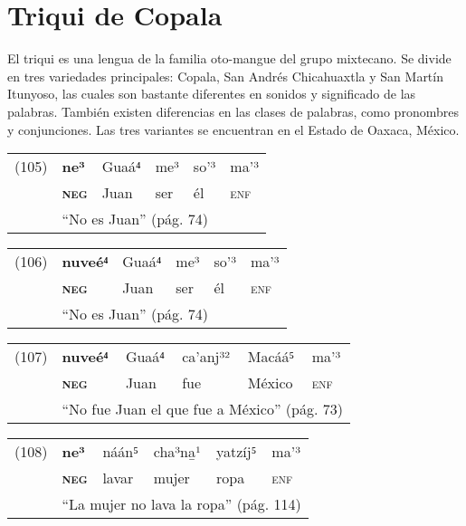 \section*{Triqui de Copala}

\noindent El triqui es una lengua de la familia oto-mangue del grupo mixtecano. Se divide en tres variedades principales: Copala, San Andrés Chicahuaxtla y San Martín Itunyoso, las cuales son bastante diferentes en sonidos y significado de las palabras. También existen diferencias en las clases de palabras, como pronombres y conjunciones. Las tres variantes se encuentran en el Estado de Oaxaca, México. \vspace{0.5cm}

{\setmainfont{Charis SIL} 

\begin{tabular}{llllll}
(105) & \textbf{ne³} & Guaá⁴ & me³ & so'³ & ma'³ \\
& \textsc{\textbf{neg}} & Juan & ser & él & \textsc{enf} \\
& \multicolumn{5}{l}{``No es Juan'' (pág. 74)}
\end{tabular} \vspace{0.3cm}

\begin{tabular}{llllll}
(106) & \textbf{nuveé⁴} & Guaá⁴ & me³ & so'³ & ma'³ \\
& \textsc{\textbf{neg}} & Juan & ser & él & \textsc{enf} \\
& \multicolumn{5}{l}{``No es Juan'' (pág. 74)}
\end{tabular} \vspace{0.3cm}

\begin{tabular}{llllll}
(107) & \textbf{nuveé⁴} & Guaá⁴ & ca'anj³² & Macáá⁵ & ma'³ \\
& \textsc{\textbf{neg}} & Juan & fue & México & \textsc{enf} \\
& \multicolumn{5}{l}{``No fue Juan el que fue a México'' (pág. 73)} 
\end{tabular} \vspace{0.3cm}

\begin{tabular}{llllll}
(108) & \textbf{ne³} & náán⁵ & cha³na̱¹ & yatzíj⁵ & ma'³ \\
& \textsc{\textbf{neg}} & lavar & mujer &  ropa & \textsc{enf} \\
& \multicolumn{5}{l}{``La mujer no lava la ropa'' (pág. 114)}
\end{tabular} \vspace{0.3cm}

}

